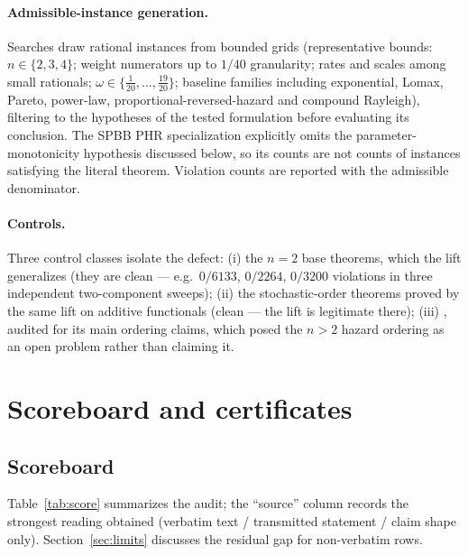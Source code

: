 \documentclass[10pt]{article}
\theoremstyle{plain}
\theoremstyle{definition}
\theoremstyle{remark}
\begin{document}
\paragraph{Admissible-instance generation.} Searches draw rational instances from bounded grids (representative bounds: $n\in\{2,3,4\}$; weight numerators up to $1\!/\!40$ granularity; rates and scales among small rationals; $\omega\in\{\tfrac1{20},\dots,\tfrac{19}{20}\}$; baseline families including exponential, Lomax, Pareto, power-law, proportional-reversed-hazard and compound Rayleigh), filtering to the hypotheses of the tested formulation before evaluating its conclusion. The SPBB PHR specialization explicitly omits the parameter-monotonicity hypothesis discussed below, so its counts are not counts of instances satisfying the literal theorem. Violation counts are reported with the admissible denominator.

\paragraph{Controls.} Three control classes isolate the defect: (i) the $n=2$ base theorems, which the lift generalizes (they are clean --- e.g.\ $0/6133$, $0/2264$, $0/3200$ violations in three independent two-component sweeps); (ii) the stochastic-order theorems proved by the same lift on additive functionals (clean --- the lift is legitimate there); (iii) \cite{ShojaeeAsadiFinkelstein2022}, audited for its main ordering claims, which posed the $n>2$ hazard ordering as an open problem rather than claiming it.

\section{Scoreboard and certificates}\label{sec:score}

\subsection{Scoreboard}

Table~\ref{tab:score} summarizes the audit; the ``source'' column records the strongest reading obtained (verbatim text / transmitted statement / claim shape only). Section~\ref{sec:limits} discusses the residual gap for non-verbatim rows.
\end{document}
